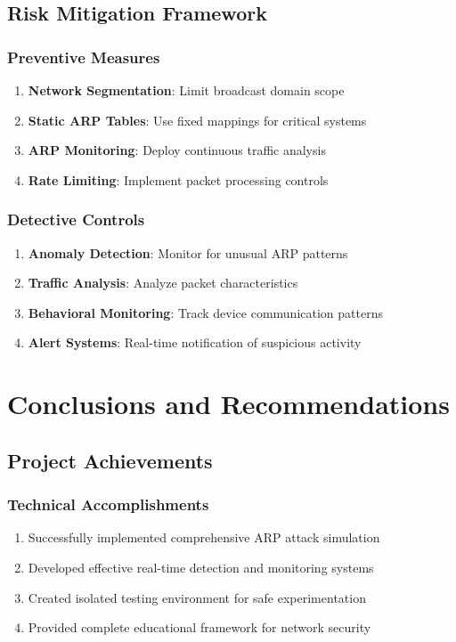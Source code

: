 \documentclass[12pt,a4paper]{article}
\begin{document}
\subsection{Risk Mitigation Framework}

\subsubsection{Preventive Measures}
\begin{enumerate}
    \item \textbf{Network Segmentation}: Limit broadcast domain scope
    \item \textbf{Static ARP Tables}: Use fixed mappings for critical systems
    \item \textbf{ARP Monitoring}: Deploy continuous traffic analysis
    \item \textbf{Rate Limiting}: Implement packet processing controls
\end{enumerate}

\subsubsection{Detective Controls}
\begin{enumerate}
    \item \textbf{Anomaly Detection}: Monitor for unusual ARP patterns
    \item \textbf{Traffic Analysis}: Analyze packet characteristics
    \item \textbf{Behavioral Monitoring}: Track device communication patterns
    \item \textbf{Alert Systems}: Real-time notification of suspicious activity
\end{enumerate}

\section{Conclusions and Recommendations}

\subsection{Project Achievements}

\subsubsection{Technical Accomplishments}
\begin{enumerate}
    \item Successfully implemented comprehensive ARP attack simulation
    \item Developed effective real-time detection and monitoring systems
    \item Created isolated testing environment for safe experimentation
    \item Provided complete educational framework for network security
\end{enumerate}
\end{document}
